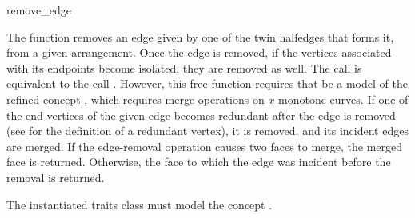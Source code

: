 \ccRefPageBegin

\begin{ccRefFunction}{remove_edge}

\ccDefinition

The function \ccRefName{} removes an edge given by one of the twin halfedges
that forms it, from a given arrangement. Once the edge is removed, if the
vertices associated with its endpoints become isolated, they are removed as
well. The call  is equivalent to the call
. However, this free function requires
that  be a model of the refined concept
, which requires merge operations
on $x$-monotone curves. If one of the end-vertices of the given edge
becomes redundant after the edge is removed (see 
for the definition of a redundant vertex), it is removed, and its
incident edges are merged.
If the edge-removal operation causes two faces to merge, the merged face
is returned. Otherwise, the face to which the edge was incident before the
removal is returned.



\ccRequirements
The instantiated traits class must model the concept
. 

\end{ccRefFunction}

\ccRefPageEnd
